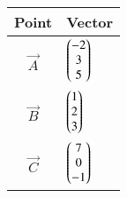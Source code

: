 \begin{tabular}{|c|p{3cm}|}
    \hline
    \textbf{Point} &\textbf{Vector} \\
    \hline
         $\vec{A}$ & $\begin{pmatrix}-2 \\ 3 \\ 5\end{pmatrix}$  \\
    \hline
        $\vec{B}$ & $\begin{pmatrix}1 \\ 2 \\ 3\end{pmatrix}$ \\
    \hline
        $\vec{C}$ & $\begin{pmatrix}7 \\ 0 \\ -1\end{pmatrix}$  \\
    \hline
\end{tabular}
